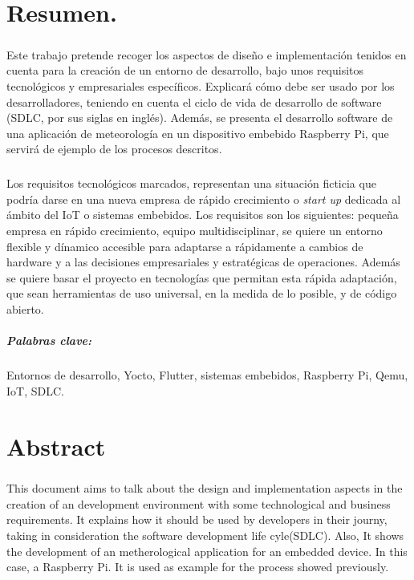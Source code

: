 \chapter{Resumen.}

\paragraph{}Este trabajo pretende recoger los aspectos de diseño e implementación
tenidos en cuenta para la creación de un entorno de desarrollo, bajo unos requisitos
tecnológicos y empresariales específicos. Explicará cómo debe ser usado por los
desarrolladores, teniendo en cuenta el ciclo de vida de desarrollo de software (SDLC,
por sus siglas en inglés). Además, se presenta el desarrollo software de una aplicación
de meteorología en un dispositivo embebido Raspberry Pi, que servirá de ejemplo de
los procesos descritos.

\paragraph{}Los requisitos tecnológicos marcados, representan una situación ficticia
que podría darse en una nueva empresa de rápido crecimiento o \textit{start up} dedicada
al ámbito del IoT o sistemas embebidos. Los requisitos son los siguientes:
pequeña empresa en rápido crecimiento, equipo multidisciplinar, se quiere un entorno
flexible y dínamico accesible para adaptarse a rápidamente a cambios de hardware y
a las decisiones empresariales y estratégicas de operaciones. Además se quiere basar
el proyecto en tecnologías que permitan esta rápida adaptación, que sean herramientas
de uso universal, en la medida de lo posible, y de código abierto.

\paragraph{Palabras clave:} Entornos de desarrollo, Yocto, Flutter, sistemas embebidos,
 Raspberry Pi, Qemu, IoT, SDLC.

\chapter{Abstract}

\paragraph{}This document aims to talk about the design and implementation aspects in
the creation of an development environment with some technological and business requirements.
It explains how it should be used by developers in their journy, taking in consideration
the software development life cyle(SDLC). Also, It shows the development of an
metherological application for an embedded device. In this case, a Raspberry Pi. It
is used as example for the process showed previously.

